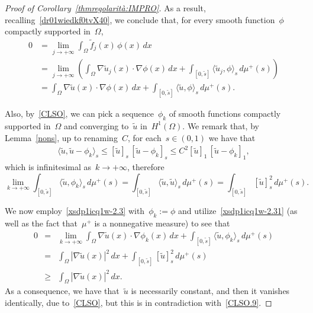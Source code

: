 \documentclass[12pt,a4paper,intlimits,sumlimits]{amsart}
\theoremstyle{definition}
\theoremstyle{plain}
\numberwithin{equation}{section}
\renewcommand{\le}{\leqslant}
\renewcommand{\ge}{\geqslant}
\begin{document}
\begin{appendix}
\begin{proof}[Proof of Corollary~\ref{thmregolarità:IMPRO}]
As a result, recalling~\eqref{dr01wiedkf0tvX40},
we conclude that, for every smooth function~$\phi$ compactly supported in~$\Omega$,
\begin{equation}\label{xsdp1icq1w-2.3}\begin{split}
0&=\lim_{j\to+\infty}\int_\Omega \widetilde f_j(x)\,\phi(x)\,dx
\\&=\lim_{j\to+\infty}\left(\int_\Omega \nabla\widetilde u_j(x)\cdot\nabla\phi(x)\,dx
+\int_{[0,\widetilde s]}\langle \widetilde u_j,\phi\rangle_s\,d\mu^+(s)\right)\\&=\int_\Omega \nabla\widetilde u(x)\cdot\nabla\phi(x)\,dx
+\int_{[0,\widetilde s]}\langle \widetilde u,\phi\rangle_s\,d\mu^+(s).
\end{split}\end{equation}

Also, by~\eqref{CLSO}, we can pick a sequence~$\phi_k$ of 
smooth functions compactly supported in~$\Omega$ and converging to~$\widetilde u$
in~$H^1(\Omega)$. We remark that, by Lemma~\ref{nons}, up to renaming~$C$, for each~$s\in(0,1)$ we have that
\begin{eqnarray*}
\langle\widetilde u,\widetilde u-\phi_k\rangle_s\le [\widetilde u]_s\,[\widetilde u-\phi_k]_s 
\le C^2 [\widetilde u]_1\,[\widetilde u-\phi_k]_1,
\end{eqnarray*}
which is infinitesimal as~$k\to+\infty$, therefore
\begin{equation}\label{xsdp1icq1w-2.31} \lim_{k\to+\infty}\int_{[0,\widetilde s]}\langle \widetilde u,\phi_k\rangle_s\,d\mu^+(s)=
\int_{[0,\widetilde s]}\langle \widetilde u,\widetilde u\rangle_s\,d\mu^+(s)=
\int_{[0,\widetilde s]}[ \widetilde u]_s^2\,d\mu^+(s).\end{equation}

We now employ~\eqref{xsdp1icq1w-2.3} with~$\phi_k:=\phi$
and utilize~\eqref{xsdp1icq1w-2.31} (as well as the fact that~$\mu^+$ is a nonnegative measure)
to see that
\begin{eqnarray*}
0&=&\lim_{k\to+\infty}\int_\Omega \nabla\widetilde u(x)\cdot\nabla\phi_k(x)\,dx
+\int_{[0,\widetilde s]}\langle \widetilde u,\phi_k\rangle_s\,d\mu^+(s)\\&=&
\int_\Omega |\nabla\widetilde u(x)|^2\,dx
+\int_{[0,\widetilde s]}[ \widetilde u]_s^2\,d\mu^+(s)\\&\ge&\int_\Omega |\nabla\widetilde u(x)|^2\,dx.
\end{eqnarray*}
As a consequence, we have that~$\widetilde u$ is necessarily constant,
and then it vanishes identically, due to~\eqref{CLSO},
but this is in contradiction with~\eqref{CLSO.9}.
\end{proof}


\end{appendix}
\end{document}
